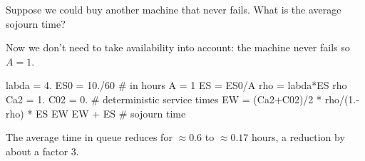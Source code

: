 \begin{exercise}[\faPhoto]
  Suppose we could buy another machine that never fails. What is the average sojourn time?
  \begin{solution}
Now we don't need to take availability into account: the machine never fails so $A=1$. 
    \begin{pyconsole}
labda = 4.
ES0 = 10./60 # in hours
A = 1
ES = ES0/A
rho = labda*ES
rho
Ca2 = 1.
C02 = 0. # deterministic service times
EW = (Ca2+C02)/2 * rho/(1.-rho) * ES
EW
EW + ES # sojourn time
\end{pyconsole}
The average time in queue reduces for $\approx 0.6$ to $\approx 0.17$ hours, a reduction by about a factor 3. 
\end{solution}
\end{exercise}







